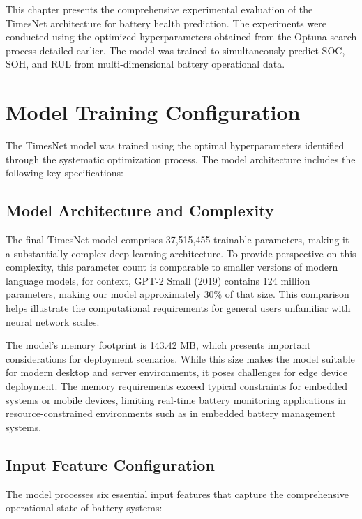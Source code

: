 This chapter presents the comprehensive experimental evaluation of the TimesNet architecture for battery health prediction. The experiments were conducted using the optimized hyperparameters obtained from the Optuna search process detailed earlier. The model was trained to simultaneously predict SOC, SOH, and RUL from multi-dimensional battery operational data.

\section{Model Training Configuration}
\label{sec:training_config}

The TimesNet model was trained using the optimal hyperparameters identified through the systematic optimization process. The model architecture includes the following key specifications:

\subsection{Model Architecture and Complexity}
\label{subsec:model_complexity}

The final TimesNet model comprises 37,515,455 trainable parameters, making it a substantially complex deep learning architecture. To provide perspective on this complexity, this parameter count is comparable to smaller versions of modern language models, for context, GPT-2 Small (2019) contains 124 million parameters, making our model approximately 30\% of that size. This comparison helps illustrate the computational requirements for general users unfamiliar with neural network scales.

The model's memory footprint is 143.42 MB, which presents important considerations for deployment scenarios. While this size makes the model suitable for modern desktop and server environments, it poses challenges for edge device deployment. The memory requirements exceed typical constraints for embedded systems or mobile devices, limiting real-time battery monitoring applications in resource-constrained environments such as in embedded battery management systems.

\subsection{Input Feature Configuration}
\label{subsec:input_features}

The model processes six essential input features that capture the comprehensive operational state of battery systems:

